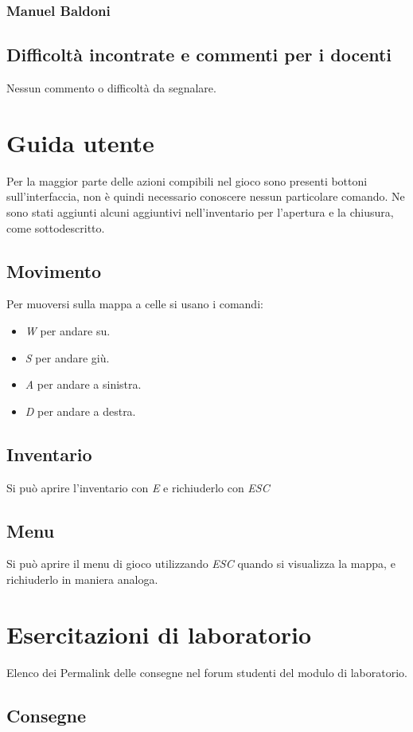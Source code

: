 \documentclass[a4paper,12pt]{report}
\begin{document}
\subsection{Manuel Baldoni}

\section{Difficoltà incontrate e commenti per i docenti}
Nessun commento o difficoltà da segnalare.

\appendix
\chapter{Guida utente}
Per la maggior parte delle azioni compibili nel gioco sono presenti bottoni sull'interfaccia, non è quindi necessario conoscere nessun particolare comando. Ne sono stati aggiunti alcuni aggiuntivi nell'inventario per l'apertura e la chiusura, come sottodescritto.
\section{Movimento}
Per muoversi sulla mappa a celle si usano i comandi:
\begin{itemize}
	\item \textit{W} per andare su.
	\item \textit{S} per andare giù.
	\item \textit{A} per andare a sinistra.
	\item \textit{D} per andare a destra.
\end{itemize}
\section{Inventario}
Si può aprire l'inventario con \textit{E} e richiuderlo con \textit{ESC}
\section{Menu}
Si può aprire il menu di gioco utilizzando \textit{ESC} quando si visualizza la mappa, e richiuderlo in maniera analoga.

\chapter{Esercitazioni di laboratorio}
Elenco dei Permalink delle consegne nel forum studenti del modulo di laboratorio.
\section*{Consegne}
\end{document}
